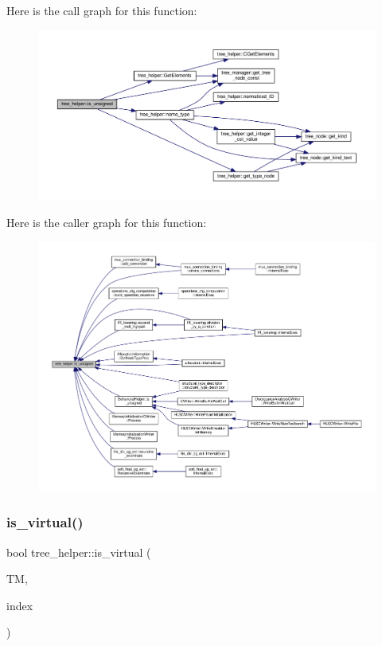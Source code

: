 Here is the call graph for this function\+:
\nopagebreak
\begin{figure}[H]
\begin{center}
\leavevmode
\includegraphics[width=350pt]{d7/d99/classtree__helper_ad9f5cee17052b3d02aa3b4a6bd87975d_cgraph}
\end{center}
\end{figure}
Here is the caller graph for this function\+:
\nopagebreak
\begin{figure}[H]
\begin{center}
\leavevmode
\includegraphics[width=350pt]{d7/d99/classtree__helper_ad9f5cee17052b3d02aa3b4a6bd87975d_icgraph}
\end{center}
\end{figure}
\mbox{\label{classtree__helper_a781409acb18b2d81e9eaa3dcec97f90d}} 
\subsubsection{\texorpdfstring{is\+\_\+virtual()}{is\_virtual()}}
{\footnotesize\ttfamily bool tree\+\_\+helper\+::is\+\_\+virtual (\begin{DoxyParamCaption}\item[{const \hyperlink{tree__manager_8hpp_a792e3f1f892d7d997a8d8a4a12e39346}{tree\+\_\+manager\+Const\+Ref} \&}]{TM,  }\item[{const unsigned int}]{index }\end{DoxyParamCaption})\hspace{0.3cm}{\ttfamily [static]}}



